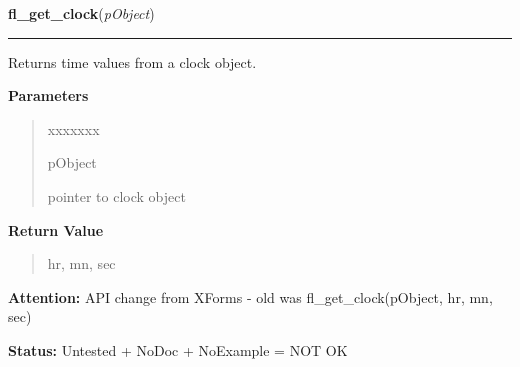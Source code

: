     \label{xformslib:library:fl_get_clock}

    \vspace{0.5ex}

\hspace{.8\funcindent}\begin{boxedminipage}{\funcwidth}

    \raggedright \textbf{fl\_get\_clock}(\textit{pObject})

    \vspace{-1.5ex}

    \rule{\textwidth}{0.5\fboxrule}
\setlength{\parskip}{2ex}
    Returns time values from a clock object.

\setlength{\parskip}{1ex}
      \textbf{Parameters}
      \vspace{-1ex}

      \begin{quote}
        \begin{Ventry}{xxxxxxx}

          \item[pObject]

          pointer to clock object

        \end{Ventry}

      \end{quote}

      \textbf{Return Value}
    \vspace{-1ex}

      \begin{quote}
      hr, mn, sec

      \end{quote}

\textbf{Attention:} API change from XForms - old was fl\_get\_clock(pObject, hr, mn, sec)



\textbf{Status:} Untested + NoDoc + NoExample = NOT OK



    \end{boxedminipage}

    \label{xformslib:library:fl_set_clock_adjustment}

    \vspace{0.5ex}

